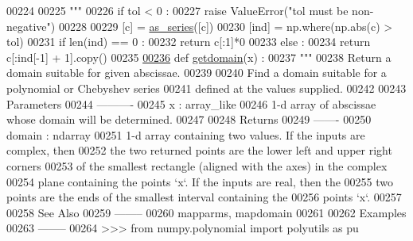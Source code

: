 \begin{DoxyCode}
00224 \textcolor{stringliteral}{}
00225 \textcolor{stringliteral}{    """}
00226     \textcolor{keywordflow}{if} tol < 0 :
00227         \textcolor{keywordflow}{raise} ValueError(\textcolor{stringliteral}{"tol must be non-negative"})
00228 
00229     [c] = \hyperlink{namespacepyneb_1_1utils_1_1polyutils_a9c3751d438f0f75922155c7823fe2699}{as\_series}([c])
00230     [ind] = np.where(np.abs(c) > tol)
00231     \textcolor{keywordflow}{if} len(ind) == 0 :
00232         \textcolor{keywordflow}{return} c[:1]*0
00233     \textcolor{keywordflow}{else} :
00234         \textcolor{keywordflow}{return} c[:ind[-1] + 1].copy()
00235 
\hypertarget{polyutils_8py_source_l00236}{}\hyperlink{namespacepyneb_1_1utils_1_1polyutils_a3216f3b76273619e84e2e0e6c22dbf21}{00236} \textcolor{keyword}{def }\hyperlink{namespacepyneb_1_1utils_1_1polyutils_a3216f3b76273619e84e2e0e6c22dbf21}{getdomain}(x) :
00237     \textcolor{stringliteral}{"""}
00238 \textcolor{stringliteral}{    Return a domain suitable for given abscissae.}
00239 \textcolor{stringliteral}{}
00240 \textcolor{stringliteral}{    Find a domain suitable for a polynomial or Chebyshev series}
00241 \textcolor{stringliteral}{    defined at the values supplied.}
00242 \textcolor{stringliteral}{}
00243 \textcolor{stringliteral}{    Parameters}
00244 \textcolor{stringliteral}{    ----------}
00245 \textcolor{stringliteral}{    x : array\_like}
00246 \textcolor{stringliteral}{        1-d array of abscissae whose domain will be determined.}
00247 \textcolor{stringliteral}{}
00248 \textcolor{stringliteral}{    Returns}
00249 \textcolor{stringliteral}{    -------}
00250 \textcolor{stringliteral}{    domain : ndarray}
00251 \textcolor{stringliteral}{        1-d array containing two values.  If the inputs are complex, then}
00252 \textcolor{stringliteral}{        the two returned points are the lower left and upper right corners}
00253 \textcolor{stringliteral}{        of the smallest rectangle (aligned with the axes) in the complex}
00254 \textcolor{stringliteral}{        plane containing the points `x`. If the inputs are real, then the}
00255 \textcolor{stringliteral}{        two points are the ends of the smallest interval containing the}
00256 \textcolor{stringliteral}{        points `x`.}
00257 \textcolor{stringliteral}{}
00258 \textcolor{stringliteral}{    See Also}
00259 \textcolor{stringliteral}{    --------}
00260 \textcolor{stringliteral}{    mapparms, mapdomain}
00261 \textcolor{stringliteral}{}
00262 \textcolor{stringliteral}{    Examples}
00263 \textcolor{stringliteral}{    --------}
00264 \textcolor{stringliteral}{    >>> from numpy.polynomial import polyutils as pu}

\end{DoxyCode}
